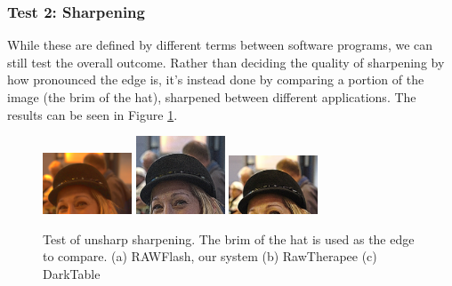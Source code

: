 \documentclass[10pt,a4paper]{article}
\begin{document}

\subsubsection{Test 2: Sharpening}
While these are defined by different terms between software programs, we can still test the overall outcome.
Rather than deciding the quality of sharpening by how pronounced the edge is, it's instead done by comparing a portion
of the image (the brim of the hat), sharpened between different applications. The results can be seen in Figure \ref{unsharpcomparison}.

\begin{figure}\label{unsharpcomparison}
    \centering
    \subfigure
    {
        \includegraphics[width=100px]{rawflash_hat_sharp}
    }
    \subfigure
    {
        \includegraphics[width=100px]{rawtherapee_unsharp_max}
    }
    \subfigure
    {
        \includegraphics[width=100px]{darktable_unsharp}
    }
    \caption{
        Test of unsharp sharpening. The brim of the hat is used as the edge to compare. 
        (a) RAWFlash, our system
        (b) RawTherapee
        (c) DarkTable
    }
 \end{figure}
\end{document}
